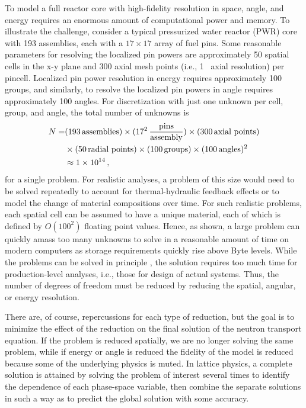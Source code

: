 To model a full reactor core with high-fidelity resolution in space, 
angle, and energy requires an enormous amount of computational power and 
memory.  To illustrate the challenge, consider a typical pressurized water 
reactor (PWR) core with 193 assemblies, each with a $17\times17$ array 
of fuel pins.  Some reasonable parameters for resolving the localized pin powers are 
approximately 50 spatial cells in the x-y plane and 300 axial mesh points 
(i.e., 1 \centi\meter\,  axial resolution) per pincell.  Localized pin power resolution in 
energy requires approximately 100 groups, and similarly, to resolve the 
localized pin powers in angle 
requires approximately 100 angles.  For discretization with just one 
unknown per cell, group, and angle, the total number of unknowns is 
\begin{equation}
    \begin{split}
    N = &(193 \, \text{assemblies})\times(17^2 \, \frac{\text{pins}}{\text{assembly}})\times(300 \, 
\text{axial points}) \\
&\times(50 \, \text{radial points})\times(100 \, \text{groups})\times(100 \, \text{angles})^2 \\
&\approx 1\times 10^{14} \, ,
\end{split}
\end{equation}
for a single problem.  For realistic analyses, a problem of this size 
would need to be solved repeatedly to account for thermal-hydraulic feedback 
effects or to model the change of material compositions over time.  For 
such realistic problems, each spatial cell can be assumed to have a unique 
material, each of which is defined by $O(100^2)$ floating point 
values.  Hence, as shown, a large problem can quickly amass too many 
unknowns to solve in a reasonable amount of time on modern computers as
storage requirements quickly rise above \peta Byte levels.  While 
the problems can be solved in principle , the solution requires too much time 
for production-level analyses, i.e., those for design of actual systems.  
Thus, the number of degrees of freedom must be reduced by reducing the spatial, 
angular, or energy resolution. 
 
There are, of course, repercussions for each type of reduction, but the goal is 
to minimize the effect of the reduction on the final solution of the neutron 
transport equation.  If the problem is reduced spatially, we are no 
longer solving the same problem, while if energy or angle is reduced the 
fidelity of the model is reduced because some of 
the underlying physics is muted.  In lattice physics, a complete solution is attained by solving  
the problem of interest several times to identify 
the dependence of each phase-space variable, then combine the separate solutions 
in such a way as to predict the global solution with some accuracy.  

